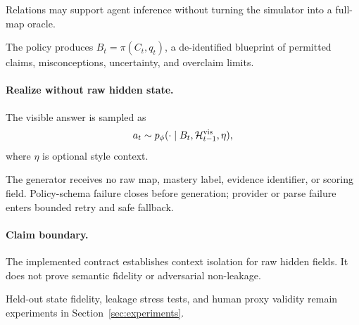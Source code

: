 Relations may support agent inference without turning the simulator into a full-map oracle.

The policy produces $B_t=\pi(C_t,q_t)$, a de-identified blueprint of permitted claims,
misconceptions, uncertainty, and overclaim limits.

\paragraph{Realize without raw hidden state.}
The visible answer is sampled as
\begin{equation}
a_t \sim p_\phi(\cdot\mid B_t,\mathcal{H}^{\mathrm{vis}}_{t-1},\eta),
\end{equation}
where $\eta$ is optional style context.

The generator receives no raw map, mastery label, evidence identifier, or scoring field. Policy-schema
failure closes before generation; provider or parse failure enters bounded retry and safe fallback.

\paragraph{Claim boundary.}
The implemented contract establishes context isolation for raw hidden fields. It does not prove
semantic fidelity or adversarial non-leakage.

Held-out state fidelity, leakage stress tests, and human proxy validity remain experiments in
Section~\ref{sec:experiments}.
